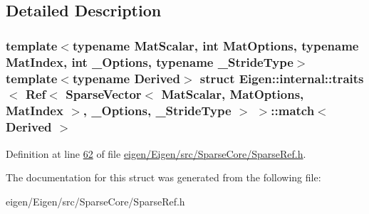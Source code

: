 \subsection{Detailed Description}
\subsubsection*{template$<$typename Mat\+Scalar, int Mat\+Options, typename Mat\+Index, int \+\_\+\+Options, typename \+\_\+\+Stride\+Type$>$\newline
template$<$typename Derived$>$\newline
struct Eigen\+::internal\+::traits$<$ Ref$<$ Sparse\+Vector$<$ Mat\+Scalar, Mat\+Options, Mat\+Index $>$, \+\_\+\+Options, \+\_\+\+Stride\+Type $>$ $>$\+::match$<$ Derived $>$}



Definition at line \hyperlink{eigen_2_eigen_2src_2_sparse_core_2_sparse_ref_8h_source_l00062}{62} of file \hyperlink{eigen_2_eigen_2src_2_sparse_core_2_sparse_ref_8h_source}{eigen/\+Eigen/src/\+Sparse\+Core/\+Sparse\+Ref.\+h}.



The documentation for this struct was generated from the following file\+:\begin{DoxyCompactItemize}
\item 
eigen/\+Eigen/src/\+Sparse\+Core/\+Sparse\+Ref.\+h\end{DoxyCompactItemize}
